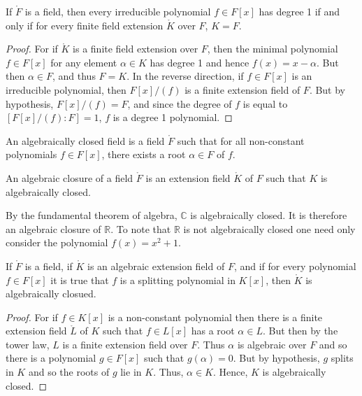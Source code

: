     \begin{theorem}
        If $\ring{F}$ is a field, then every irreducible polynomial
        $f\in{F}[x]$ has degree 1 if and only if for every finite field
        extension $\ring{K}$ over $F$, $K=F$.
    \end{theorem}
    \begin{proof}
        For if $\ring{K}$ is a finite field extension over $F$, then the
        minimal polynomial $f\in{F}[x]$ for any element $\alpha\in{K}$ has
        degree 1 and hence $f(x)=x-\alpha$. But then $\alpha\in{F}$, and
        thus $F=K$. In the reverse direction, if $f\in{F}[x]$ is an
        irreducible polynomial, then $F[x]/(f)$ is a finite extension field
        of $F$. But by hypothesis, $F[x]/(f)=F$, and since the degree of
        $f$ is equal to $[F[x]/(f):F]=1$, $f$ is a degree 1 polynomial.
    \end{proof}
    \begin{definition}
        An algebraically closed field is a field $\ring{F}$ such that for
        all non-constant polynomials $f\in{F}[x]$, there exists a root
        $\alpha\in{F}$ of $f$.
    \end{definition}
    \begin{definition}
        An algebraic closure of a field $\ring{F}$ is an extension field
        $\ring{K}$ of $F$ such that $K$ is algebraically closed.
    \end{definition}
    \begin{example}
        By the fundamental theorem of algebra, $\mathbb{C}$ is algebraically
        closed. It is therefore an algebraic closure of $\mathbb{R}$. To
        note that $\mathbb{R}$ is not algebraically closed one need only
        consider the polynomial $f(x)=x^{2}+1$.
    \end{example}
    \begin{theorem}
        If $\ring{F}$ is a field, if $\ring{K}$ is an algebraic extension
        field of $F$, and if for every polynomial $f\in{F}[x]$ it is true
        that $f$ is a splitting polynomial in $K[x]$, then $\ring{K}$ is
        algebraically closued.
    \end{theorem}
    \begin{proof}
        For if $f\in{K}[x]$ is a non-constant polynomial then there is a
        finite extension field $\ring{L}$ of $K$ such that $f\in{L}[x]$ has
        a root $\alpha\in{L}$. But then by the tower law, $L$ is a finite
        extension field over $F$. Thus $\alpha$ is algebraic over $F$ and
        so there is a polynomial $g\in{F}[x]$ such that $g(\alpha)=0$. But
        by hypothesis, $g$ splits in $K$ and so the roots of $g$ lie in
        $K$. Thus, $\alpha\in{K}$. Hence, $K$ is algebraically closed.
    \end{proof}
